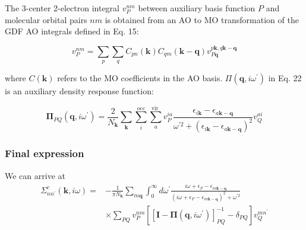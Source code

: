 The 3-center 2-electron integral $v_{P}^{n m}$ between auxiliary basis function $P$ and molecular orbital pairs $n m$ is obtained from an AO to MO transformation of the GDF AO integrals defined in Eq. 15:

\begin{equation*}
v_{P}^{n m}=\sum_{p} \sum_{q} C_{p n}(\mathbf{k}) C_{q m}(\mathbf{k}-\mathbf{q}) v_{P \mathbf{q}}^{p \mathbf{k}, q \mathbf{k}-\mathbf{q}} 
\end{equation*}

where $C(\mathbf{k})$ refers to the MO coefficients in the AO basis. $\Pi\left(\mathbf{q}, i \omega^{\prime}\right)$ in Eq. 22 is an auxiliary density response function:

\begin{equation*}
\boldsymbol{\Pi}_{P Q}\left(\mathbf{q}, i \omega^{\prime}\right)=\frac{2}{N_{\mathbf{k}}} \sum_{\mathbf{k}} \sum_{i}^{\mathrm{occ}} \sum_{a}^{\text {vir }} v_{P}^{i a} \frac{\epsilon_{i \mathbf{k}}-\epsilon_{a \mathbf{k}-\mathbf{q}}}{\omega^{\prime 2}+\left(\epsilon_{i \mathbf{k}}-\epsilon_{a \mathbf{k}-\mathbf{q}}\right)^{2}} v_{Q}^{a i} 
\end{equation*}
\subsubsection{Final expression}
We can arrive at
\begin{align}
\Sigma_{n n^{\prime}}^c(\mathbf{k}, i \omega)= & -\frac{1}{\pi N_{\mathbf{k}}} \sum_{m \mathbf{q}} \int_0^{\infty} d \omega^{\prime} \frac{i \omega+\epsilon_F-\epsilon_{m \mathbf{k}-\mathbf{q}}}{\left(i \omega+\epsilon_F-\epsilon_{m \mathbf{k}-\mathbf{q}}\right)^2+\omega^{\prime 2}} \\ & \times \sum_{P Q} v_P^{n m}\left[\left[\mathbf{I}-\mathbf{\Pi}\left(\mathbf{q}, i \omega^{\prime}\right)\right]_{P Q}^{-1}-\delta_{P Q}\right] v_Q^{m n^{\prime}}
\end{align}
